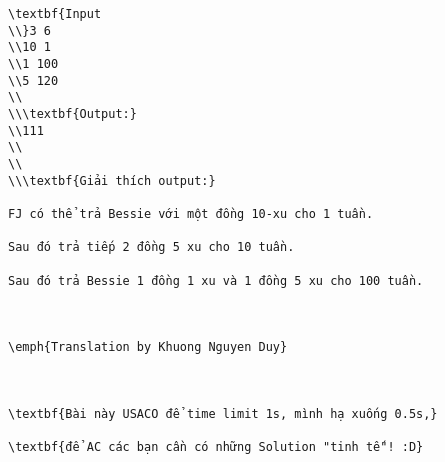 \begin{verbatim}
\textbf{Input
\\}3 6
\\10 1
\\1 100
\\5 120
\\
\\\textbf{Output:}
\\111
\\
\\
\\\textbf{Giải thích output:}

FJ có thể trả Bessie với một đồng 10-xu cho 1 tuần.

Sau đó trả tiếp 2 đồng 5 xu cho 10 tuần.

Sau đó trả Bessie 1 đồng 1 xu và 1 đồng 5 xu cho 100 tuần.

 

\emph{Translation by Khuong Nguyen Duy}

 

\textbf{Bài này USACO để time limit 1s, mình hạ xuống 0.5s,}

\textbf{để AC các bạn cần có những Solution "tinh tế"! :D}\end{verbatim}